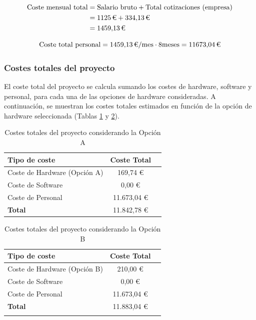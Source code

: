 \begin{align*}
\text{Coste mensual total} &= \text{Salario bruto} + \text{Total cotizaciones (empresa)} \\
&= 1125\,\text{\texteuro{}} + 334{,}13\,\text{\texteuro{}} \\ 
&= 1459{,}13\,\text{\texteuro{}} 
\end{align*}

\begin{equation*}
\text{Coste total personal} = 1459{,}13\,\text{\texteuro{}}/\text{mes} \cdot 8 \text{meses} = 11673{,}04\,\text{\texteuro{}} 
\end{equation*}



 \subsubsection{Costes totales del proyecto}
 El coste total del proyecto se calcula sumando los costes de hardware, software y personal, para cada una de las opciones de hardware consideradas. A continuación, se muestran los costes totales estimados en función de la opción de hardware seleccionada (Tablas \ref{tab:costes_total_A} y \ref{tab:costes_total_B}).

 
 \begin{table}[h]
    \centering
    \begin{tabular}{lcc}
    \textbf{Tipo de coste} & \textbf{Coste Total}\\
    \hline
    Coste de Hardware (Opción A)  & 169,74 €\\
    Coste de Software & 0,00 €\\
    Coste de Personal & 11.673,04 €\\
    \textbf{Total} & 11.842,78 €\\
    \end{tabular}
    \caption{Costes totales del proyecto considerando la Opción A} \label{tab:costes_total_A}
\end{table}

 \begin{table}[h]
    \centering
    \begin{tabular}{lcc}
    \textbf{Tipo de coste} & \textbf{Coste Total}\\
    \hline
    Coste de Hardware (Opción B)  & 210,00 €\\
    Coste de Software & 0,00 €\\
    Coste de Personal & 11.673,04 €\\
    \textbf{Total} & 11.883,04 €\\
    \hfill
    \end{tabular}
    \caption{Costes totales del proyecto considerando la Opción B} \label{tab:costes_total_B}
\end{table}

